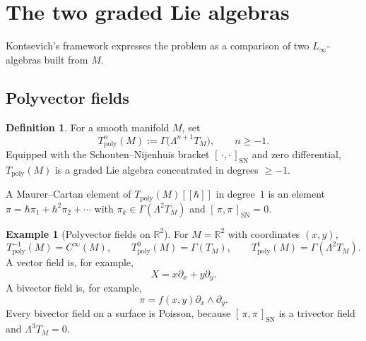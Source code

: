 \documentclass[11pt,a4paper]{article}
\theoremstyle{definition}
\newtheorem{definition}[theorem]{Definition}
\newtheorem{example}[theorem]{Example}
\newcommand{\R}{\mathbb{R}}
\newcommand{\Tpoly}{T_{\mathrm{poly}}}
\newcommand{\Cinfty}{C^{\infty}}
\newcommand{\Sch}[2]{[\,#1,#2\,]_{\mathrm{SN}}}
\begin{document}
\section{The two graded Lie algebras}\label{sec:two-gla}

Kontsevich's framework expresses the problem as a comparison of two
$L_\infty$-algebras built from $M$.

\subsection{Polyvector fields}\label{ssec:Tpoly}

\begin{definition}\label{def:Tpoly}
For a smooth manifold $M$, set
\[
\Tpoly^{n}(M) := \Gamma\bigl(\Lambda^{n+1} T_M\bigr), \qquad n \ge -1.
\]
Equipped with the Schouten--Nijenhuis bracket $\Sch{\cdot}{\cdot}$ and
zero differential, $\Tpoly(M)$ is a graded Lie algebra concentrated in
degrees $\ge -1$.
\end{definition}

A Maurer--Cartan element of $\Tpoly(M)[[\hbar]]$ in degree~$1$ is an
element $\pi = \hbar \pi_{1} + \hbar^{2} \pi_{2} + \cdots$ with
$\pi_{k} \in \Gamma(\Lambda^{2} T_M)$ and $\Sch{\pi}{\pi} = 0$.

\begin{example}[Polyvector fields on $\R^2$]
\label{ex:polyvectors-r2}
For $M=\R^2$ with coordinates $(x,y)$,
\[
\Tpoly^{-1}(M)=\Cinfty(M),\qquad
\Tpoly^0(M)=\Gamma(T_M),\qquad
\Tpoly^1(M)=\Gamma(\Lambda^2 T_M).
\]
A vector field is, for example,
\[
X=x\partial_x+y\partial_y.
\]
A bivector field is, for example,
\[
\pi=f(x,y)\partial_x\wedge\partial_y.
\]
Every bivector field on a surface is Poisson, because
$\Sch{\pi}{\pi}$ is a trivector field and $\Lambda^3 T_M=0$.
\end{example}
\end{document}
